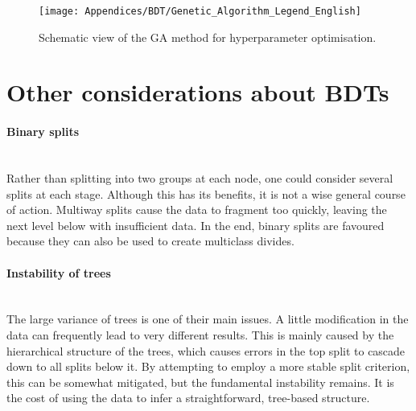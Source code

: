 \begin{figure}[h]
\centering
  \centering
  \texttt{[image: Appendices/BDT/Genetic\_Algorithm\_Legend\_English]}
\caption{Schematic view of the GA method for hyperparameter optimisation.}
\label{fig:Appendix:BDT:GA_loop}
\end{figure}




\section{Other considerations about BDTs}
\label{chap:Appendix:BDT:Concepts}
\paragraph{Binary splits}\mbox{}\\
Rather than splitting into two groups at each node, one could consider
several splits at each stage. Although this has its benefits, it is not a wise 
general course of action. Multiway splits cause the data to fragment too quickly, 
leaving the next level below with insufficient data. In the end, binary splits are 
favoured because they can also be used to create multiclass divides.


\paragraph{Instability of trees}\mbox{}\\
The large variance of trees is one of their main issues. A little modification in the 
data can frequently lead to very different results. This is mainly caused by the
hierarchical structure of the trees, which causes errors in the top split to cascade 
down to all splits below it. By attempting to employ a more stable split criterion, 
this can be somewhat mitigated, but the fundamental instability remains. It is the 
cost of using the data to infer a straightforward, tree-based structure. 

